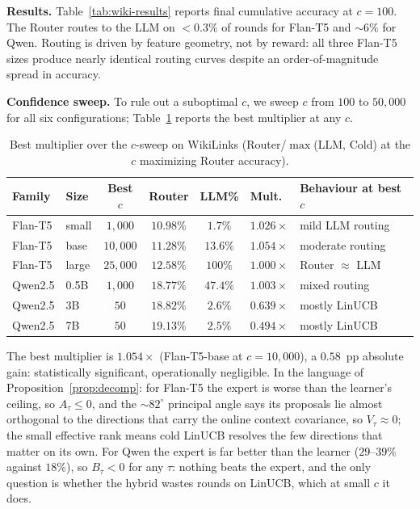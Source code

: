\documentclass{article}
\theoremstyle{definition}
\theoremstyle{remark}
\theoremstyle{remark}
\begin{document}
\textbf{Results.} Table~\ref{tab:wiki-results} reports final cumulative
accuracy at $c=100$. The Router routes to the LLM on $<0.3\%$ of rounds for
Flan-T5 and $\sim6\%$ for Qwen. Routing is driven by feature geometry, not by
reward: all three Flan-T5 sizes produce nearly identical routing curves
despite an order-of-magnitude spread in accuracy.

\textbf{Confidence sweep.} To rule out a suboptimal $c$, we sweep $c$ from
$100$ to $50{,}000$ for all six configurations; Table~\ref{tab:wiki-csweep}
reports the best multiplier at any $c$.

\begin{table}[h]
\centering
\caption{Best multiplier over the $c$-sweep on WikiLinks
(Router/$\max$(LLM, Cold) at the $c$ maximizing Router accuracy).}
\label{tab:wiki-csweep}
\small
\begin{tabular}{@{}llccccl@{}}
\toprule
Family & Size & Best $c$ & Router & LLM\% & Mult.\ & Behaviour at best $c$ \\
\midrule
Flan-T5 & small & $1{,}000$ & $10.98\%$ & $1.7\%$ & $1.026\times$ & mild LLM routing \\
Flan-T5 & base  & $10{,}000$ & $11.28\%$ & $13.6\%$ & $1.054\times$ & moderate routing \\
Flan-T5 & large & $25{,}000$ & $12.58\%$ & $100\%$ & $1.000\times$ & Router $\approx$ LLM \\
\midrule
Qwen2.5 & 0.5B  & $1{,}000$ & $18.77\%$ & $47.4\%$ & $1.003\times$ & mixed routing \\
Qwen2.5 & 3B    & $50$ & $18.82\%$ & $2.6\%$ & $0.639\times$ & mostly LinUCB \\
Qwen2.5 & 7B    & $50$ & $19.13\%$ & $2.5\%$ & $0.494\times$ & mostly LinUCB \\
\bottomrule
\end{tabular}
\end{table}

The best multiplier is $1.054\times$ (Flan-T5-base at $c=10{,}000$), a
$0.58$~pp absolute gain: statistically significant, operationally negligible.
In the language of Proposition~\ref{prop:decomp}: for Flan-T5 the expert is
worse than the learner's ceiling, so $A_\tau\le0$, and the $\sim82^\circ$
principal angle says its proposals lie almost orthogonal to the directions
that carry the online context covariance, so $V_\tau\approx0$; the small
effective rank means cold LinUCB resolves the few directions that matter on
its own. For Qwen the expert is far better than the learner ($29$--$39\%$
against $18\%$), so $B_\tau<0$ for any $\tau$: nothing beats the expert, and
the only question is whether the hybrid wastes rounds on LinUCB, which at
small $c$ it does.
\end{document}
